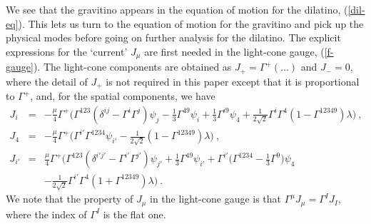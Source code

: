 \documentclass[a4paper,12pt]{article}
\numberwithin{equation}{section}
\begin{document}
We see that the gravitino appears in the equation of motion for the
dilatino, (\ref{dil-eq}).  This lets us turn to the equation of motion
for the gravitino and pick up the physical modes before going on
further analysis for the dilatino.  The explicit expressions for the
`current' $J_\mu$ are first needed in the light-cone gauge,
(\ref{f-gauge}).  The light-cone components are obtained as $J_+ =
\Gamma^+ ( \ldots ) $ and $J_- = 0$, where the detail of $J_+$ is not
required in this paper except that it is proportional to $\Gamma^+$,
and, for the spatial components, we have
\begin{eqnarray}
J_i &=& - \frac{\mu}{4} \Gamma^+
   \bigg( \Gamma^{123} ( \delta^{ij}-\Gamma^i \Gamma^j ) \psi_j
         - \frac{1}{3} \Gamma^{49} \psi_i
         + \frac{1}{3} \Gamma^{i9} \psi_4
         + \frac{1}{2\sqrt{2}} \Gamma^i \Gamma^4
           ( 1 - \Gamma^{12349} ) \lambda
   \bigg) ~,
  \nonumber \\
J_4 &=& - \frac{\mu}{4} \Gamma^+
    \bigg( \Gamma^{i'} \Gamma^{1234} \psi_{i'}
          - \frac{1}{2 \sqrt{2}} ( 1 - \Gamma^{12349} ) \lambda
    \bigg) ~,
  \nonumber \\
J_{i'} &=& \frac{\mu}{4} \Gamma^+
    \bigg(  \Gamma^{123} ( \delta^{i'j'}-\Gamma^{i'}\Gamma^{j'} )
               \psi_{j'}
           + \frac{1}{3} \Gamma^{49} \psi_{i'}
           + \Gamma^{i'} \Big( \Gamma^{1234} - \frac{1}{3} \Gamma^9
                       \Big)  \psi_4
  \nonumber \\
   & &     - \frac{1}{2\sqrt{2}} \Gamma^{i'} \Gamma^4
              ( 1 + \Gamma^{12349} ) \lambda
    \bigg) ~.
\label{j-current}
\end{eqnarray}
We note that the property of $J_\mu$ in the light-cone gauge is that
$\Gamma^\mu J_\mu = \Gamma^I J_I$, where the index of $\Gamma^I$ is
the flat one.
\end{document}
